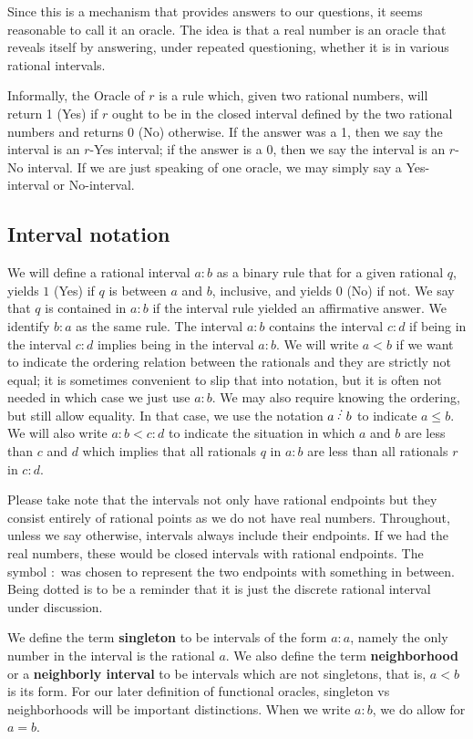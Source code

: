 \documentclass[12pt]{article}
\theoremstyle{remark}
\begin{document}
Since this is a mechanism that provides answers to our questions, it seems reasonable to call it an oracle. The idea is that a real number is an oracle that reveals itself by answering, under repeated questioning, whether it is in various rational intervals. 

Informally, the Oracle of $r$ is a rule which, given two rational numbers, will return 1 (Yes) if $r$ ought to be in the closed interval defined by the two rational numbers and returns 0 (No) otherwise. If the answer was a 1, then we say the interval is an $r$-Yes interval; if the answer is a 0, then we say the interval is an $r$-No interval.  If we are just speaking of one oracle, we may simply say a Yes-interval or No-interval. 

\subsection{Interval notation}

We will define a rational interval $a:b$ as a binary rule that for a given rational $q$, yields $1$ (Yes) if $q$ is between $a$ and $b$, inclusive, and yields $0$ (No) if not. We say that $q$ is contained in $a:b$ if the interval rule yielded an affirmative answer.  We identify $b:a$ as the same rule. The interval $a:b$ contains the interval $c:d$ if being in the interval $c:d$ implies being in the interval $a:b$. We will write $a\lt b$ if we want to indicate the ordering relation between the rationals and they are strictly not equal; it is sometimes convenient to slip that into notation, but it is often not needed in which case we just use $a:b$. We may also require knowing the ordering, but still allow equality. In that case, we use the notation $a \lte b$ to indicate $a \leq b$.  We will also write $a:b < c:d$ to indicate the situation in which $a$ and $b$ are less than $c$ and $d$ which implies that all rationals $q$ in $a:b$ are less than all rationals $r$ in $c:d$.


Please take note that the intervals not only have rational endpoints but they consist entirely of rational points as we do not have real numbers. Throughout, unless we say otherwise, intervals always include their endpoints. If we had the real numbers, these would be closed intervals with rational endpoints.  The symbol $:$ was chosen to represent the two endpoints with something in between. Being dotted is to be a reminder that it is just the discrete rational interval under discussion. 

We define the term \textbf{singleton} to be intervals of the form $a:a$, namely the only number in the interval is the rational $a$. We also define the term \textbf{neighborhood} or a \textbf{neighborly interval} to be intervals which are not singletons, that is, $a \lt b$ is its form. For our later definition of functional oracles, singleton vs neighborhoods will be important distinctions. When we write $a:b$, we do allow for $a=b$.
\end{document}

